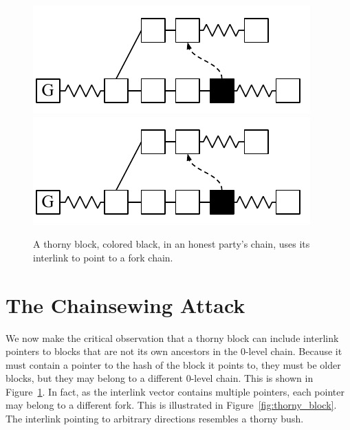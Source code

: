\begin{figure}[H]
	\begin{center}
		\iftwocolumn
			\includegraphics[width=0.6\columnwidth]{figures/false_interlink.pdf}
		\else
			\includegraphics[width=0.35\columnwidth]{figures/false_interlink.pdf}
		\fi
	\end{center}
    \caption{A thorny block, colored black, in an honest party's chain, uses its interlink to point to a fork chain.}
	\label{fig:false_interlink}
\end{figure}

\section{The Chainsewing Attack}\label{sec:attack}
We now make the critical observation that a thorny block can include interlink
pointers to blocks that are not its own ancestors in the $0$-level chain.
Because it must contain a pointer to the hash of the block it points to, they
must be older blocks, but they may belong to a
different $0$-level chain. This is shown in Figure~\ref{fig:false_interlink}.
In fact, as the interlink vector contains multiple pointers, each pointer may
belong to a different fork. This is illustrated in
Figure~\ref{fig:thorny_block}. The interlink pointing to arbitrary directions
resembles a thorny bush.

